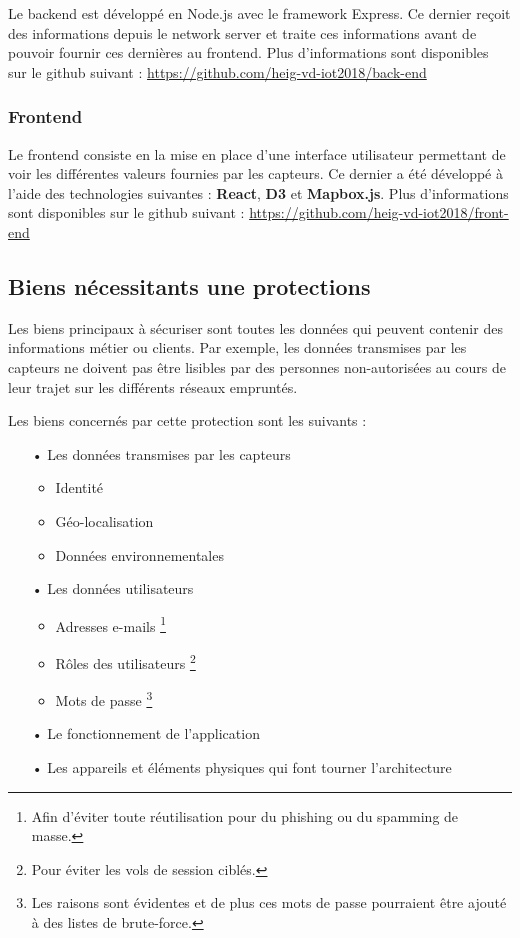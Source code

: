 Le backend est développé en Node.js avec le framework Express. Ce dernier reçoit des informations depuis le network server et traite ces informations avant de pouvoir fournir ces dernières au frontend.
Plus d'informations sont disponibles sur le github suivant : \url{https://github.com/heig-vd-iot2018/back-end}

\subsubsection{Frontend}
Le frontend consiste en la mise en place d'une interface utilisateur permettant de voir les différentes valeurs fournies par les capteurs. Ce dernier a été développé à l'aide des technologies suivantes : \textbf{React}, \textbf{D3} et \textbf{Mapbox.js}.
Plus d'informations sont disponibles sur le github suivant : \url{https://github.com/heig-vd-iot2018/front-end}

\newpage
\subsection{Biens nécessitants une protections}

Les biens principaux à sécuriser sont toutes les données qui peuvent contenir des informations métier ou clients. Par exemple, les données transmises par les capteurs ne doivent pas être lisibles par des personnes non-autorisées au cours de leur trajet sur les différents réseaux empruntés.

Les biens concernés par cette protection sont les suivants :

\begin{itemize}
\item[•] Les données transmises par les capteurs
\begin{itemize}
\item Identité
\item Géo-localisation
\item Données environnementales
\end{itemize}
\item[•] Les données utilisateurs
\begin{itemize}
\item Adresses e-mails \footnote{Afin d'éviter toute réutilisation pour du phishing ou du spamming de masse.}
\item Rôles des utilisateurs \footnote{Pour éviter les vols de session ciblés.}
\item Mots de passe \footnote{Les raisons sont évidentes et de plus ces mots de passe pourraient être ajouté à des listes de brute-force.}
\end{itemize}
\item[•] Le fonctionnement de l'application
\item[•] Les appareils et éléments physiques qui font tourner l'architecture
\end{itemize}

